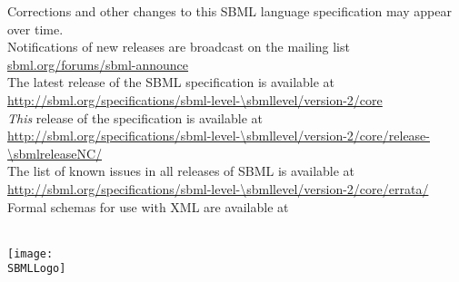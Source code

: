 \maketitle

\vfill

\begin{center}\sffamily
Corrections and other changes to this SBML language specification may appear over time.\\
Notifications of new releases are broadcast on the mailing list \href{http://www.sbml.org/Forums/sbml-announce}{sbml.org/forums/sbml-announce}\\[10pt]

The latest release of the SBML \thisLV specification is available at\\
\url{http://sbml.org/specifications/sbml-level-\sbmllevel/version-2/core}\\[10pt]

\emph{This} release of the specification is available at\\
\url{http://sbml.org/specifications/sbml-level-\sbmllevel/version-2/core/release-\sbmlreleaseNC/}\\[10pt]

The list of known issues in all releases of SBML \thisLV is available at\\
\url{http://sbml.org/specifications/sbml-level-\sbmllevel/version-2/core/errata/}\\[10pt]

Formal schemas for use with XML are available at\\
\sbmlSchemasURL\\[10pt]
\end{center}

\vfill

\centerline{\texttt{[image: \\SBMLLogo]}}
